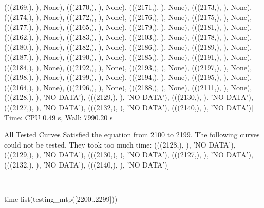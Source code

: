  (((2169,), {}), None),
 (((2170,), {}), None),
 (((2171,), {}), None),
 (((2173,), {}), None),
 (((2174,), {}), None),
 (((2172,), {}), None),
 (((2176,), {}), None),
 (((2175,), {}), None),
 (((2177,), {}), None),
 (((2165,), {}), None),
 (((2179,), {}), None),
 (((2181,), {}), None),
 (((2162,), {}), None),
 (((2183,), {}), None),
 (((2103,), {}), None),
 (((2178,), {}), None),
 (((2180,), {}), None),
 (((2182,), {}), None),
 (((2186,), {}), None),
 (((2189,), {}), None),
 (((2187,), {}), None),
 (((2190,), {}), None),
 (((2185,), {}), None),
 (((2191,), {}), None),
 (((2184,), {}), None),
 (((2192,), {}), None),
 (((2193,), {}), None),
 (((2197,), {}), None),
 (((2198,), {}), None),
 (((2199,), {}), None),
 (((2194,), {}), None),
 (((2195,), {}), None),
 (((2164,), {}), None),
 (((2196,), {}), None),
 (((2188,), {}), None),
 (((2111,), {}), None),
 (((2128,), {}), 'NO DATA'),
 (((2129,), {}), 'NO DATA'),
 (((2130,), {}), 'NO DATA'),
 (((2127,), {}), 'NO DATA'),
 (((2132,), {}), 'NO DATA'),
 (((2140,), {}), 'NO DATA')]
Time: CPU 0.49 s, Wall: 7990.20 s


All Tested Curves Satisfied the equation from 2100 to 2199.
The following curves could not be tested.
They took too much time:
 (((2128,), {}), 'NO DATA'),
 (((2129,), {}), 'NO DATA'),
 (((2130,), {}), 'NO DATA'),
 (((2127,), {}), 'NO DATA'),
 (((2132,), {}), 'NO DATA'),
(((2140,), {}), 'NO DATA')]

  ------------------------------------------------------------------------------

  
 time list(testing_mtp([2200..2299]))

